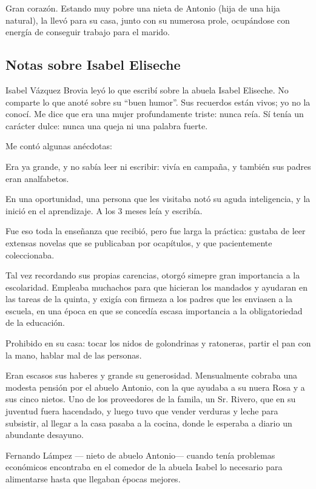 \documentclass[a4paper]{article}
\begin{document}
Gran corazón. Estando muy pobre una nieta de Antonio (hija de una hija natural), la llevó para su casa, junto con su numerosa prole, ocupándose con energía de conseguir trabajo para el marido.

\subsection{Notas sobre Isabel Eliseche}

Isabel Vázquez Brovia leyó lo que escribí sobre la abuela Isabel Eliseche. No comparte lo que anoté sobre su ``buen humor''. Sus recuerdos están vivos; yo no la conocí. Me dice que era una mujer profundamente triste: nunca reía. Sí tenía un carácter dulce: nunca una queja ni una palabra fuerte.

Me contó algunas anécdotas:

\bigbreak{}

Era ya grande, y no sabía leer ni escribir: vivía en campaña, y también sus padres eran analfabetos.

En una oportunidad, una persona que les visitaba notó su aguda inteligencia, y la inició en el aprendizaje. A los 3 meses leía y escribía.

Fue eso toda la enseñanza que recibió, pero fue larga la práctica: gustaba de leer extensas novelas que se publicaban por ocapítulos, y que pacientemente coleccionaba.

Tal vez recordando sus propias carencias, otorgó simepre gran importancia a la escolaridad. Empleaba muchachos para que hicieran los mandados y ayudaran en las tareas de la quinta, y exigía con firmeza a los padres que les enviasen a la escuela, en una época en que se concedía escasa importancia a la obligatoriedad de la educación.

Prohibido en su casa: tocar los nidos de golondrinas y ratoneras, partir el pan con la mano, hablar mal de las personas.

Eran escasos sus haberes y grande su generosidad. Mensualmente cobraba una modesta pensión por el abuelo Antonio, con la que ayudaba a su nuera Rosa y a sus cinco nietos. Uno de los proveedores de la famila, un Sr. Rivero, que en su juventud fuera hacendado, y luego tuvo que vender verduras y leche para subsistir, al llegar a la casa pasaba a la cocina, donde le esperaba a diario un abundante desayuno.

Fernando Lámpez --- nieto de abuelo Antonio--- cuando tenía problemas e\-co\-nó\-mi\-cos encontraba en el comedor de la abuela Isabel lo necesario para alimentarse hasta que llegaban épocas mejores.
\end{document}
